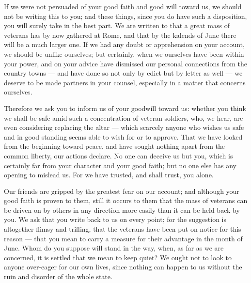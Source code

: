 

 If we were not persuaded of your good faith and good will toward us, we should not be writing this to you; and these things, since you do have such a disposition, you will surely take in the best part. We are written to that a great mass of veterans has by now gathered at Rome, and that by the kalends of June there will be a much larger one. If we had any doubt or apprehension on your account, we should be unlike ourselves; but certainly, when we ourselves have been within your power, and on your advice have dismissed our personal connections from the country towns --- and have done so not only by edict but by letter as well --- we deserve to be made partners in your counsel, especially in a matter that concerns ourselves.

 Therefore we ask you to inform us of your goodwill toward us: whether you think we shall be safe amid such a concentration of veteran soldiers, who, we hear, are even considering replacing the altar --- which scarcely anyone who wishes us safe and in good standing seems able to wish for or to approve. That we have looked from the beginning toward peace, and have sought nothing apart from the common liberty, our actions declare. No one can deceive us but you, which is certainly far from your character and your good faith; but no one else has any opening to mislead us. For we have trusted, and shall trust, you alone.

 Our friends are gripped by the greatest fear on our account; and although your good faith is proven to them, still it occurs to them that the mass of veterans can be driven on by others in any direction more easily than it can be held back by you. We ask that you write back to us on every point; for the suggestion is altogether flimsy and trifling, that the veterans have been put on notice for this reason --- that you mean to carry a measure for their advantage in the month of June. Whom do you suppose will stand in the way, when, as far as we are concerned, it is settled that we mean to keep quiet? We ought not to look to anyone over-eager for our own lives, since nothing can happen to us without the ruin and disorder of the whole state.
